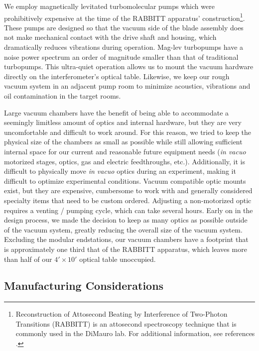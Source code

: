 We employ magnetically levitated turbomolecular pumps which were prohibitively expensive at the time of the RABBITT apparatus' construction\footnote{Reconstruction of Attosecond Beating by Interference of Two-Photon Transitions (RABBITT) is an attosecond spectroscopy technique that is commonly used in the DiMauro lab. For additional information, see references \cite{gormanAttosecondProbingElectron2018,kiesewetterDynamicsNearThresholdAttosecond2019,schounAttosecondHighHarmonicSpectroscopy2015,chirlaAttosecondPulseGeneration2011}.}. These pumps are designed so that the vacuum side of the blade assembly does not make mechanical contact with the drive shaft and housing, which dramatically reduces vibrations during operation. Mag-lev turbopumps have a noise power spectrum an order of magnitude smaller than that of traditional turbopumps. This ultra-quiet operation allows us to mount the vacuum hardware directly on the interferometer's optical table. Likewise, we keep our rough vacuum system in an adjacent pump room to minimize acoustics, vibrations and oil contamination in the target rooms.

Large vacuum chambers have the benefit of being able to accommodate a seemingly limitless amount of optics and internal hardware, but they are very uncomfortable and difficult to work around. For this reason, we tried to keep the physical size of the chambers as small as possible while still allowing sufficient internal space for our current and reasonable future equipment needs (\textit{in vacuo} motorized stages, optics, gas and electric feedthroughs, etc.). Additionally, it is difficult to physically move \textit{in vacuo} optics during an experiment, making it difficult to optimize experimental conditions. Vacuum compatible optic mounts exist, but they are expensive, cumbersome to work with and generally considered specialty items that need to be custom ordered. Adjusting a non-motorized optic requires a venting / pumping cycle, which can take several hours. Early on in the design process, we made the decision to keep as many optics as possible outside of the vacuum system, greatly reducing the overall size of the vacuum system. Excluding the modular endstations, our vacuum chambers have a footprint that is approximately one third that of the RABBITT apparatus, which leaves more than half of our $4' \times 10'$ optical table unoccupied.

\subsection{Manufacturing Considerations}

